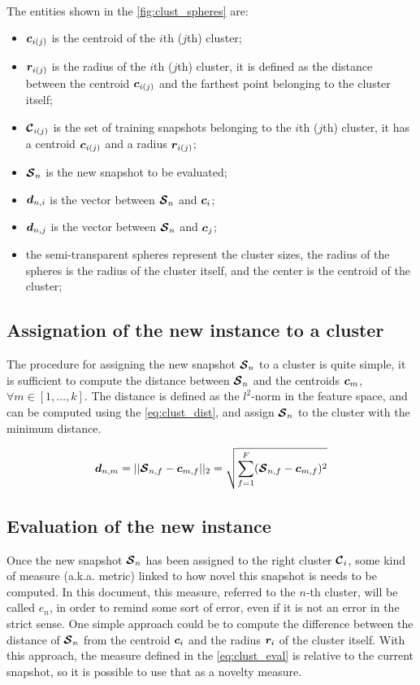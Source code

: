 \paragraph*{}
The entities shown in the \autoref{fig:clust_spheres} are:
\begin{itemize}
  \item $\bm{c}_{i(j)}$ is the centroid of the $i$th ($j$th) cluster;
  \item $\bm{r}_{i(j)}$ is the radius of the $i$th ($j$th) cluster, it is defined as the distance between the centroid $\bm{c}_{i(j)}$ and the farthest point belonging to the cluster itself;
  \item $\bm{\mathcal{C}}_{i(j)}$ is the set of training snapshots belonging to the $i$th ($j$th) cluster, it has a centroid $\bm{c}_{i(j)}$ and a radius $\bm{r}_{i(j)}$;
  \item $\bm{\mathcal{S}}_n$ is the new snapshot to be evaluated;
  \item $\bm{d}_{n,i}$ is the vector between $\bm{\mathcal{S}}_n$ and $\bm{c}_i$;
  \item $\bm{d}_{n,j}$ is the vector between $\bm{\mathcal{S}}_n$ and $\bm{c}_j$;
  \item the semi-transparent spheres represent the cluster sizes, the radius of the spheres is the radius of the cluster itself, and the center is the centroid of the cluster;
\end{itemize}

\subsection{Assignation of the new instance to a cluster} 
The procedure for assigning the new snapshot $\bm{\mathcal{S}}_n$ to a cluster is quite simple, it is sufficient to compute the distance between $\bm{\mathcal{S}}_n$ and the centroids $\bm{c}_m$, $\forall m \in  [1, \dots , k]$. The distance is defined as the $l^2$-norm in the feature space, and can be computed using the \autoref{eq:clust_dist}, and assign $\bm{\mathcal{S}}_n$ to the cluster with the minimum distance.

\begin{equation}
  \label{eq:clust_dist}
  \bm{d}_{n,m} = ||\bm{\mathcal{S}}_{n,f} - \bm{c}_{m,f}||_2 = \sqrt{\sum_{f=1}^{F} (\bm{\mathcal{S}}_{n,f} - \bm{c}_{m,f})^2}
\end{equation}

\subsection{Evaluation of the new instance}
Once the new snapshot $\bm{\mathcal{S}}_n$ has been assigned to the right cluster $\bm{\mathcal{C}}_i$, some kind of measure (a.k.a. metric) linked to how novel this snapshot is needs to be computed. In this document, this measure, referred to the $n$-th cluster, will be called $e_n$, in order to remind some sort of error, even if it is not an error in the strict sense. One simple approach could be to compute the difference between the distance of $\bm{\mathcal{S}}_n$ from the centroid $\bm{c}_i$ and the radius $\bm{r}_i$ of the cluster itself. With this approach, the measure defined in the \autoref{eq:clust_eval} is relative to the current snapshot, so it is possible to use that as a novelty measure.

